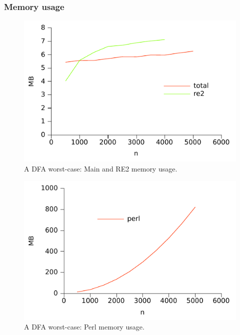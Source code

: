 \subsubsection{Memory usage}

\begin{figure}
\centering
\includegraphics{benchmarks/memory/dfaworstcase_mainre2.pdf}
\caption{A DFA worst-case: Main and RE2 memory usage.}
\label{fig:dfaworstcase_mem_mainre2}
\end{figure}

\begin{figure}
\centering
\includegraphics{benchmarks/memory/dfaworstcase_perl.pdf}
\caption{A DFA worst-case: Perl memory usage.}
\label{fig:dfaworstcase_mem_perl}
\end{figure}

